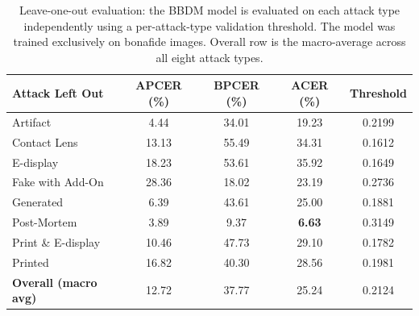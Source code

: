 \begin{table}[t]
  \centering
  \caption{Leave-one-out evaluation: the BBDM model is evaluated on each
           attack type independently using a per-attack-type validation
           threshold. The model was trained exclusively on bonafide images.
           Overall row is the macro-average across all eight attack types.}
  \label{tab:loo}
  \begin{tabular}{lSSSS[table-format=1.4]}
    \toprule
    \textbf{Attack Left Out}
      & \textbf{APCER (\%)} & \textbf{BPCER (\%)}
      & \textbf{ACER (\%)}  & \textbf{Threshold} \\
    \midrule
    Artifact           &  4.44 & 34.01 &     19.23 & 0.2199 \\
    Contact Lens       & 13.13 & 55.49 &     34.31 & 0.1612 \\
    E-display          & 18.23 & 53.61 &     35.92 & 0.1649 \\
    Fake with Add-On   & 28.36 & 18.02 &     23.19 & 0.2736 \\
    Generated          &  6.39 & 43.61 &     25.00 & 0.1881 \\
    Post-Mortem        &  3.89 &  9.37 & \textbf{6.63}  & 0.3149 \\
    Print \& E-display & 10.46 & 47.73 &     29.10 & 0.1782 \\
    Printed            & 16.82 & 40.30 &     28.56 & 0.1981 \\
    \midrule
    \textbf{Overall (macro avg)} & 12.72 & 37.77 & 25.24 & 0.2124 \\
    \bottomrule
  \end{tabular}
\end{table}
